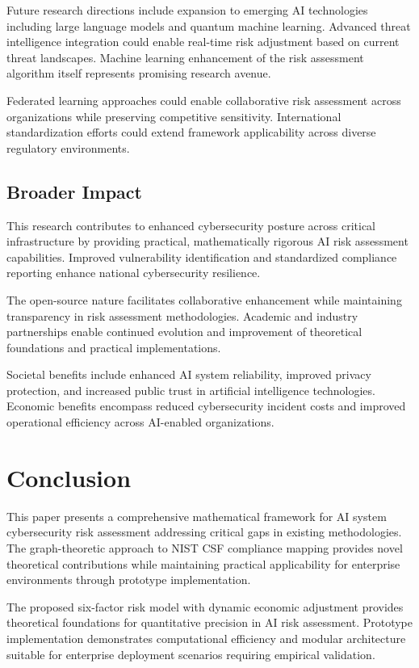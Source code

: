 \documentclass[11pt,letterpaper]{article}
\begin{document}
Future research directions include expansion to emerging AI technologies including large language models and quantum machine learning. Advanced threat intelligence integration could enable real-time risk adjustment based on current threat landscapes. Machine learning enhancement of the risk assessment algorithm itself represents promising research avenue.

Federated learning approaches could enable collaborative risk assessment across organizations while preserving competitive sensitivity. International standardization efforts could extend framework applicability across diverse regulatory environments.

\subsection{Broader Impact}

This research contributes to enhanced cybersecurity posture across critical infrastructure by providing practical, mathematically rigorous AI risk assessment capabilities. Improved vulnerability identification and standardized compliance reporting enhance national cybersecurity resilience.

The open-source nature facilitates collaborative enhancement while maintaining transparency in risk assessment methodologies. Academic and industry partnerships enable continued evolution and improvement of theoretical foundations and practical implementations.

Societal benefits include enhanced AI system reliability, improved privacy protection, and increased public trust in artificial intelligence technologies. Economic benefits encompass reduced cybersecurity incident costs and improved operational efficiency across AI-enabled organizations.

\section{Conclusion}

This paper presents a comprehensive mathematical framework for AI system cybersecurity risk assessment addressing critical gaps in existing methodologies. The graph-theoretic approach to NIST CSF compliance mapping provides novel theoretical contributions while maintaining practical applicability for enterprise environments through prototype implementation.

The proposed six-factor risk model with dynamic economic adjustment provides theoretical foundations for quantitative precision in AI risk assessment. Prototype implementation demonstrates computational efficiency and modular architecture suitable for enterprise deployment scenarios requiring empirical validation.
\end{document}
